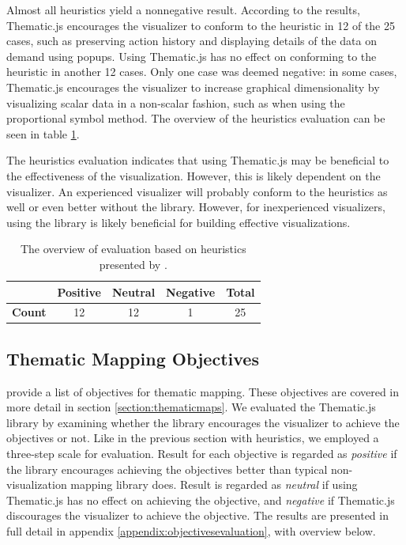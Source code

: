 Almost all heuristics yield a nonnegative result. According to the results, Thematic.js encourages the visualizer to conform to the heuristic in 12 of the 25 cases, such as preserving action history and displaying details of the data on demand using popups. Using Thematic.js has no effect on conforming to the heuristic in another 12 cases. Only one case was deemed negative: in some cases, Thematic.js encourages the visualizer to increase graphical dimensionality by visualizing scalar data in a non-scalar fashion, such as when using the proportional symbol method. The overview of the heuristics evaluation can be seen in table \ref{table:heuristicsevaluationoverview}. 

The heuristics evaluation indicates that using Thematic.js may be beneficial to the effectiveness of the visualization. However, this is likely dependent on the visualizer. An experienced visualizer will probably conform to the heuristics as well or even better without the library. However, for inexperienced visualizers, using the library is likely beneficial for building effective visualizations. 

\begin{table}[h]
\centering
\begin{tabular}{|l|c|c|c|c|}
\hline
 & \textbf{Positive} & \textbf{Neutral} & \textbf{Negative} & \textbf{Total} \\ 
\hline
\textbf{Count} & 12 & 12 & 1 & 25 \\
\hline
\end{tabular}
\caption{The overview of evaluation based on heuristics presented by \citet{zuk_heuristics_2006}.}
\label{table:heuristicsevaluationoverview}
\end{table}

\subsection{Thematic Mapping Objectives}

\citet{schlichtmann_visualization_2002} provide a list of objectives for thematic mapping. These objectives are covered in more detail in section \ref{section:thematicmaps}. We evaluated the Thematic.js library by examining whether the library encourages the visualizer to achieve the objectives or not. Like in the previous section with heuristics, we employed a three-step scale for evaluation. Result for each objective is regarded as \emph{positive} if the library encourages achieving the objectives better than typical non-visualization mapping library does. Result is regarded as \emph{neutral} if using Thematic.js has no effect on achieving the objective, and \emph{negative} if Thematic.js discourages the visualizer to achieve the objective. The results are presented in full detail in appendix \ref{appendix:objectivesevaluation}, with overview below.

